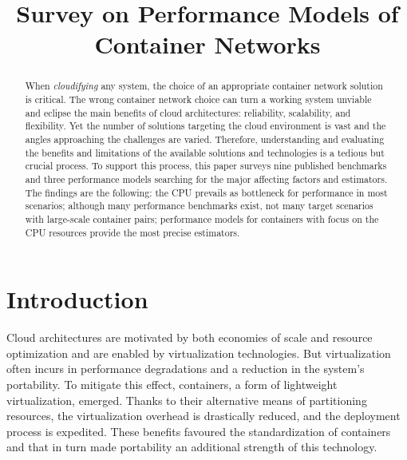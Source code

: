 \documentclass[conference]{IEEEtran}
\begin{document}
%
\title{Survey on Performance Models of Container Networks}


\author{
}

\maketitle

\begin{abstract}
When \textit{cloudifying} any system, the choice of an appropriate container network solution is critical. The wrong container network choice can turn a working system unviable and eclipse the main benefits of cloud architectures: reliability, scalability, and flexibility. Yet the number of solutions targeting the cloud environment is vast and the angles approaching the challenges are varied. Therefore, understanding and evaluating the benefits and limitations of the available solutions and technologies is a tedious but crucial process. To support this process, this paper surveys nine published benchmarks and three performance models searching for the major affecting factors and estimators. The findings are the following: the CPU prevails as bottleneck for performance in most scenarios; although many performance benchmarks exist, not many target scenarios with large-scale container pairs; performance models for containers with focus on the CPU resources provide the most precise estimators. 
\end{abstract}


\section{Introduction}
Cloud architectures are motivated by both economies of scale and resource optimization and are enabled by virtualization technologies. But virtualization often incurs in performance degradations and a reduction in the system's portability. To mitigate this effect, containers, a form of lightweight virtualization, emerged. Thanks to their alternative means of partitioning resources, the virtualization overhead is drastically reduced, and the deployment process is expedited. These benefits favoured the standardization of containers and that in turn made portability an additional strength of this technology.
\end{document}
